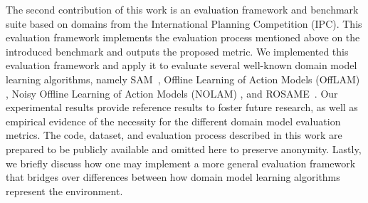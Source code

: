 \documentclass[letterpaper]{article} %
\newcommand{\sam}{\ac{SAM}\xspace}
\newif\ifaddcomments
\newcommand{\roni}[1]{\ifaddcomments{\textcolor{red}{[Roni: #1]}}\fi}
\newcommand{\leo}[1]{\ifaddcomments{\textcolor{pink}{[Leonardo: #1]}}\fi}
\begin{document}
%
The second contribution of this work is an evaluation framework and benchmark suite based on domains from the International Planning Competition (IPC). 
This evaluation framework implements the evaluation process mentioned above on the introduced benchmark and outputs the proposed metric. %
We implemented this evaluation framework and apply it to evaluate several well-known domain model learning algorithms, namely \sam~\cite{juba2021safe}, Offline Learning of Action Models (OffLAM) \citep{LAMANNA2025104256}, Noisy Offline Learning of Action Models (NOLAM) \citep{Lamanna24}, and ROSAME~\cite{xi2024neuro}. 
Our experimental results provide reference results to foster future research, as well as  empirical evidence of the necessity for the different domain model evaluation metrics. 
The code, dataset, and evaluation process described in this work are prepared to be publicly available and omitted here to preserve anonymity. 
Lastly, we briefly discuss how one may implement a more general evaluation framework that bridges over differences between how domain model learning algorithms represent the environment. 
\end{document}
